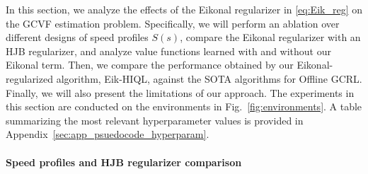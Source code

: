 \documentclass{article}
\theoremstyle{plain}
\theoremstyle{definition}
\theoremstyle{remark}
\begin{document}
In this section, we analyze the effects of the Eikonal regularizer in \eqref{eq:Eik_reg} on the GCVF estimation problem. Specifically, we will perform an ablation over different designs of speed profiles $S(s)$, compare the Eikonal regularizer with an HJB regularizer, and analyze value functions learned with and without our Eikonal term. Then, we compare the performance obtained by our Eikonal-regularized algorithm, Eik-HIQL, against the SOTA algorithms for Offline GCRL. Finally, we will also present the limitations of our approach. The experiments in this section are conducted on the environments in Fig.~\ref{fig:environments}. A table summarizing the most relevant hyperparameter values is provided in Appendix~\ref{sec:app_psuedocode_hyperparam}.  

\vspace{-0.0cm}
\paragraph{Speed profiles and HJB regularizer comparison} 
\end{document}
